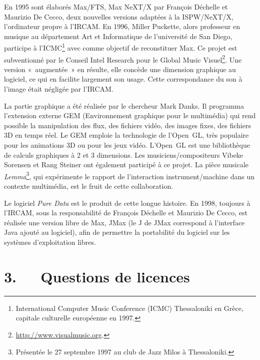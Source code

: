 \documentclass{FramateX}
\begin{document}
\begin{refsection}
En 1995 sont élaborés Max/FTS, Max NeXT/X par François Déchelle et
Maurizio De Cecco, deux nouvelles versions adaptées à la ISPW/NeXT/X,
l'ordinateur propre à l'IRCAM. En 1996, Miller Puckette, alors
professeur en musique au département Art et Informatique de
l'université de San Diego, participe à l'ICMC\footnote{International
Computer Music Conference (ICMC) Thessaloniki en Grèce, capitale
culturelle européenne en 1997.} avec comme objectif de reconstituer
Max. Ce projet est subventionné par le Conseil Intel Research pour le
Global Music Visuel\footnote{\url{http://www.visualmusic.org}.}. Une
version «~augmentée~» en résulte, elle concède une dimension graphique
au logiciel, ce qui en facilite largement son usage. Cette
correspondance du son à l'image était négligée par l'IRCAM. 

La partie graphique a été réalisée par le chercheur Mark Danks. Il
programma l'extension externe
GEM (Environnement graphique pour le multimédia) qui rend possible la
manipulation des flux, des fichiers vidéo, des images fixes, des
fichiers 3D en temps réel. Le GEM emploie la technologie de l'Open~GL,
très populaire pour les animations 3D ou pour les jeux vidéo.
L'Open~GL est une bibliothèque de calculs graphiques à
2 et 3 dimensions. Les musiciens/compositeurs Vibeke Sorensen et Rang
Steiner ont également participé à ce projet. La pièce musicale
\textit{Lemma}\footnote{Présentée le 27 septembre 1997 au club de Jazz Milos
à Thessaloniki.}, qui expérimente le rapport de l'interaction
instrument/machine dans un contexte multimédia, est le fruit de cette
collaboration.

Le logiciel \textit{Pure Data} est le produit de cette longue histoire. En 1998,
toujours à l'IRCAM, sous la responsabilité de François Déchelle et
Maurizio De Cecco, est réalisée une version libre de Max, JMax (le J de
JMax correspond à l'interface Java ajouté au logiciel), afin de
permettre la portabilité du logiciel sur les systèmes d'exploitation
libres. 

\section*{3.~~~Questions de licences}
{}


\end{refsection}
\end{document}
